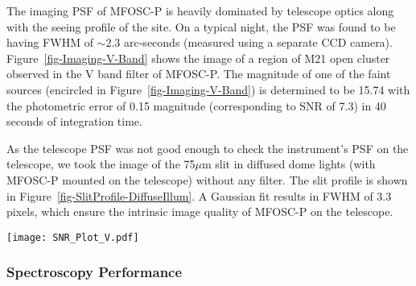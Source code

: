 The imaging PSF of MFOSC-P is heavily dominated by telescope optics along with the seeing profile of the site. On a typical night, the PSF was found to be having FWHM of $\sim2.3$ arc-seconds (measured using a separate CCD camera). Figure~\ref{fig-Imaging-V-Band} shows the image of a region of M21 open cluster observed in the V band filter of MFOSC-P. The magnitude of one of the faint sources (encircled in Figure~\ref{fig-Imaging-V-Band}) is determined to be 15.74 with the photometric error of 0.15 magnitude (corresponding to SNR of 7.3) in 40 seconds of integration time.
\par 
As the telescope PSF was not good enough to check the instrument's PSF on the telescope, we took the image of the 75$\mu$m slit in diffused dome lights (with MFOSC-P mounted on the telescope) without any filter. The slit profile is shown in Figure~\ref{fig-SlitProfile-DiffuseIllum}. A Gaussian fit results in FWHM of 3.3 pixels, which ensure the intrinsic image quality of MFOSC-P on the telescope. 



\begin{figure*}
	\centering
	\texttt{[image: SNR\_Plot\_V.pdf]}
	\vspace{0.2cm}
	\caption{The plots show the expected SNRs from MFOSC-P for various V band magnitudes, for all the three spectroscopy modes. The expected SNR (solid circles) are obtained from a theoretical simulation model for 100 seconds (dotted line), 300 seconds (dashed line), and 600 seconds (solid line) of the simulated observations. The achieved SNR from MFOSC-P observations for varying integration time, and various magnitudes are also shown in the solid triangles. The corresponding integration times for each of the observations are also mentioned, along with the data points. The achieved SNRs are in good agreement with the predicted SNR values. See section~\ref{subsubsec-SkySpec} for details.}
	\label{fig-SNR}
\end{figure*}




\par
\subsubsection{Spectroscopy Performance} 
\label{subsubsec-SkySpec}
\par

